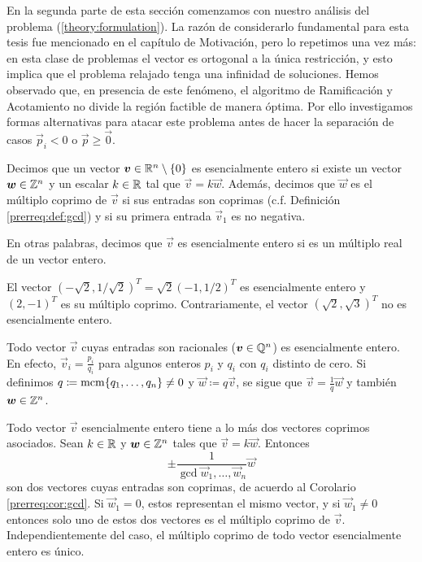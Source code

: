En la segunda parte de esta sección comenzamos con nuestro análisis del problema
(\ref{theory:formulation}). La razón de considerarlo fundamental para esta tesis fue mencionado en
el capítulo de Motivación, pero lo repetimos una vez más: en esta clase de problemas el vector es
ortogonal a la única restricción, y esto implica que el problema relajado tenga una infinidad de
soluciones. Hemos observado que, en presencia de este fenómeno, el algoritmo de Ramificación y
Acotamiento no divide la región factible de manera óptima. Por ello investigamos formas alternativas
para atacar este problema antes de hacer la separación de casos $\vec{p}_i < 0$ o $\vec{p} \geq
\vec{0}$.
\begin{definition}
	\label{theory:def:rational}
	Decimos que un vector $\boldsymbol{v} \in \mathbb{R}^n \setminus \lbrace 0 \rbrace$ es esencialmente
	entero si existe un vector $\boldsymbol{w} \in \mathbb{Z}^n$ y un escalar $k \in \mathbb{R}$ tal que $\vec{v} =
	k\vec{w}$. Además, decimos que $\vec{w}$ es el múltiplo coprimo de $\vec{v}$ si sus entradas son
	coprimas (c.f. Definición \ref{prerreq:def:gcd}) y si su primera entrada $\vec{v}_1$ es no
	negativa.
\end{definition}
En otras palabras, decimos que $\vec{v}$ es esencialmente entero si es un múltiplo real de un vector
entero.
\begin{example}
	El vector $\left(-\sqrt{2}, 1/\sqrt{2}\right)^T = \sqrt{2}(-1, 1/2)^T$ es esencialmente entero
	y $(2, -1)^T$ es su múltiplo coprimo. Contrariamente, el vector $(\sqrt{2}, \sqrt{3})^T$ no es
	esencialmente entero.
\end{example}
\begin{observation}
	Todo vector $\vec{v}$ cuyas entradas son racionales ($\boldsymbol{v} \in \mathbb{Q}^n$) es esencialmente
	entero. En efecto, $\vec{v}_i = \frac{p_i}{q_i}$ para algunos enteros $p_i$ y $q_i$ con $q_i$
	distinto de cero. Si definimos $q \coloneq \mathop{\mathrm{mcm}{\left\lbrace q_1, \ldots, q_n \right\rbrace}} \neq 0$ y $\vec{w} \coloneq
	q\vec{v}$, se sigue que $\vec{v} = \frac{1}{q}\vec{w}$ y también $\boldsymbol{w} \in \mathbb{Z}^n$.
\end{observation}
\begin{observation}
	Todo vector $\vec{v}$ esencialmente entero tiene a lo más dos vectores coprimos asociados. Sean
	$k \in \mathbb{R}$ y $\boldsymbol{w} \in \mathbb{Z}^n$ tales que $\vec{v} = k\vec{w}$. Entonces
	\begin{equation*}
		\pm \frac{1}{\gcd{\vec{w}_1, \ldots, \vec{w}_n}}\vec{w}
	\end{equation*}
	son dos vectores cuyas entradas son coprimas, de acuerdo al Corolario \ref{prerreq:cor:gcd}. Si
	$\vec{w}_1 = 0$, estos representan el mismo vector, y si $\vec{w}_1 \neq 0$ entonces solo uno de
	estos dos vectores es el múltiplo coprimo de $\vec{v}$. Independientemente del caso, el múltiplo
	coprimo de todo vector esencialmente entero es único.
\end{observation}

